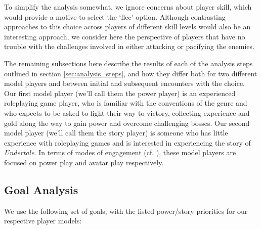 \documentclass[arts,article,submit,moreauthors,pdftex,10pt,a4paper]{Definitions/mdpi}
\begin{document}
To simplify the analysis somewhat, we ignore concerns about player skill, which would provide a motive to select the `flee' option.
%
Although contrasting approaches to this choice across players of different skill levels would also be an interesting approach, we consider here the perspective of players that have no trouble with the challenges involved in either attacking or pacifying the enemies.

The remaining subsections here describe the results of each of the analysis steps outlined in section \ref{sec:analysis_steps}, and how they differ both for two different model players and between initial and subsequent encounters with the choice.
%
Our first model player (we'll call them the power player) is an experienced roleplaying game player, who is familiar with the conventions of the genre and who expects to be asked to fight their way to victory, collecting experience and gold along the way to gain power and overcome challenging bosses.
%
Our second model player (we'll call them the story player) is someone who has little experience with roleplaying games and is interested in experiencing the story of \emph{Undertale}.
%
In terms of modes of engagement (cf. \cite{mawhorter2014towards}), these model players are focused on power play and avatar play respectively.

\subsection{Goal Analysis}

We use the following set of goals, with the listed power/story priorities for our respective player models:
\end{document}
